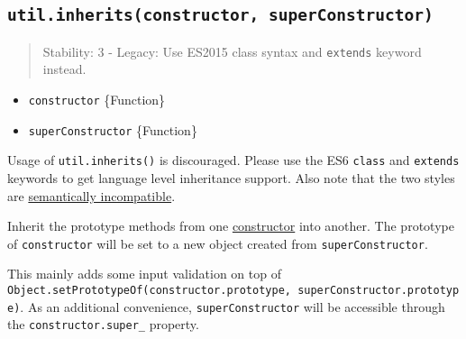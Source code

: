 \subsection{\texorpdfstring{\texttt{util.inherits(constructor,\ superConstructor)}}{util.inherits(constructor, superConstructor)}}\label{util.inheritsconstructor-superconstructor}

\begin{quote}
Stability: 3 - Legacy: Use ES2015 class syntax and \texttt{extends}
keyword instead.
\end{quote}

\begin{itemize}
\tightlist
\item
  \texttt{constructor} \{Function\}
\item
  \texttt{superConstructor} \{Function\}
\end{itemize}

Usage of \texttt{util.inherits()} is discouraged. Please use the ES6
\texttt{class} and \texttt{extends} keywords to get language level
inheritance support. Also note that the two styles are
\href{https://github.com/nodejs/node/issues/4179}{semantically
incompatible}.

Inherit the prototype methods from one
\href{https://developer.mozilla.org/en-US/docs/Web/JavaScript/Reference/Global_Objects/Object/constructor}{constructor}
into another. The prototype of \texttt{constructor} will be set to a new
object created from \texttt{superConstructor}.

This mainly adds some input validation on top of
\texttt{Object.setPrototypeOf(constructor.prototype,\ superConstructor.prototype)}.
As an additional convenience, \texttt{superConstructor} will be
accessible through the \texttt{constructor.super\_} property.

